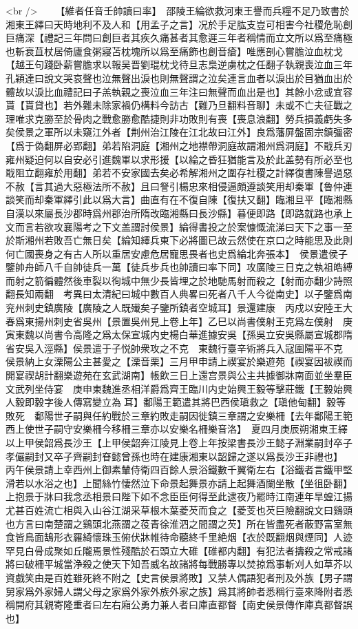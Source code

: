 <br />
　　【維者任音壬帥讀曰率】　邵陵王綸欲救河東王譽而兵糧不足乃致書於湘東王繹曰天時地利不及人和【用孟子之言】况於手足肱支豈可相害今社稷危恥創巨痛深【禮記三年問曰創巨者其疾久痛甚者其愈遲三年者稱情而立文所以爲至痛極也斬衰苴杖居倚廬食粥寢苫枕塊所以爲至痛飾也創音瘡】唯應剖心嘗膽泣血枕戈【越王句踐卧薪嘗膽求以報吴晋劉琨枕戈待旦志梟逆虜枕之任翻子執親喪泣血三年孔穎達曰說文哭哀聲也泣無聲出淚也則無聲謂之泣矣連言血者以淚出於目猶血出於體故以淚比血禮記曰子羔執親之喪泣血三年注曰無聲而血出是也】其餘小忿或宜容貰【貰貸也】若外難未除家禍仍構料今訪古【難乃旦翻料音聊】未或不亡夫征戰之理唯求克勝至於骨肉之戰愈勝愈酷捷則非功敗則有喪【喪息浪翻】勞兵損義虧失多矣侯景之軍所以未窺江外者【荆州治江陵在江北故曰江外】良爲藩屏盤固宗鎮彊密【爲于偽翻屏必郢翻】弟若陷洞庭【湘州之地襟帶洞庭故謂湘州爲洞庭】不戢兵刃雍州疑迫何以自安必引進魏軍以求形援【以綸之昏狂猶能言及於此盖勢有所必至也戢阻立翻雍於用翻】弟若不安家國去矣必希解湘州之圍存社稷之計繹復書陳譽過惡不赦【言其過大惡極法所不赦】且曰詧引楊忠來相侵逼頗遵談笑用却秦軍【魯仲連談笑而却秦軍繹引此以爲大言】曲直有在不復自陳【復扶又翻】臨湘旦平【臨湘縣自漢以來屬長沙郡時爲州郡治所隋改臨湘縣曰長沙縣】暮便即路【即路就路也承上文而言若欲攻襄陽考之下文盖謂討侯景】綸得書投之於案慷慨流涕曰天下之事一至於斯湘州若敗吾亡無日矣【綸知繹兵東下必將圖已故云然使在京口之時能思及此則何亡國喪身之有古人所以重居安慮危居寵思畏者也史爲綸北奔張本】　侯景遣侯子鑒帥舟師八千自帥徒兵一萬【徒兵步兵也帥讀曰率下同】攻廣陵三日克之執祖皓縛而射之箭徧體然後車裂以徇城中無少長皆埋之於地馳馬射而殺之【射而亦翻少詩照翻長知兩翻　考異曰太清紀曰城中數百人典畧曰死者八千人今從南史】以子鑒爲南兖州刺史鎮廣陵【廣陵之人既殱矣子鑒所鎮者空城耳】景還建康　丙戍以安陸王大春爲東揚州刺史省吳州【景置吳州見上卷上年】乙巳以尚書僕射王克爲左僕射　庚寅東魏以尚書令高隆之爲太保宣城内史楊白華進據安吳【孫吳立安吳縣屬宣城郡隋省安吳入涇縣】侯景遣于子悦帥衆攻之不克　東魏行臺辛術將兵入寇圍陽平不克　侯景納上女溧陽公主甚愛之【溧音栗】三月甲申請上禊宴於樂遊苑【禊宴因袚禊而開宴禊胡計翻樂遊苑在玄武湖南】帳飲三日上還宫景與公主共據御牀南面並坐羣臣文武列坐侍宴　庚申東魏進丞相洋爵爲齊王臨川内史始興王毅等擊莊鐵【王毅始興人毅即毅字後人傳寫變立為耳】鄱陽王範遣其將巴西侯瑱救之【瑱他甸翻】毅等敗死　鄱陽世子嗣與任約戰於三章約敗走嗣因徙鎮三章謂之安樂柵【去年鄱陽王範西上使世子嗣守安樂柵今移柵三章亦以安樂名柵樂音洛】　夏四月庚辰朔湘東王繹以上甲侯韶爲長沙王【上甲侯韶奔江陵見上卷上年按梁書長沙王懿子淵業嗣封卒子孝儼嗣封又卒子齊嗣封眘懿曾孫也時在建康湘東以韶歸之遂以爲長沙王非禮也】　丙午侯景請上幸西州上御素輦侍衛四百餘人景浴鐵數千翼衛左右【浴鐵者言鐵甲堅滑若以水浴之也】上聞絲竹悽然泣下命景起舞景亦請上起舞酒闌坐散【坐徂卧翻】上抱景于牀曰我念丞相景曰陛下如不念臣臣何得至此逮夜乃罷時江南連年旱蝗江揚尤甚百姓流亡相與入山谷江湖采草根木葉菱芡而食之【菱芰也芡巨險翻說文曰鷄頭也方言曰南楚謂之鷄頭北燕謂之䓈青徐淮泗之間謂之芡】所在皆盡死者蔽野富室無食皆鳥面鵠形衣羅綺懷珠玉俯伏牀帷待命聽終千里絶烟【衣於既翻烟與煙同】人迹罕見白骨成聚如丘隴焉景性殘酷於石頭立大碓【碓都内翻】有犯法者擣殺之常戒諸將曰破柵平城當浄殺之使天下知吾威名故諸將每戰勝專以焚掠爲事斬刈人如草芥以資戲笑由是百姓雖死終不附之【史言侯景將敗】又禁人偶語犯者刑及外族【男子謂舅家爲外家婦人謂父母之家爲外家外族外家之族】爲其將帥者悉稱行臺來降附者悉稱開府其親寄隆重者曰左右廂公勇力兼人者曰庫直都督【南史侯景傳作庫真都督誤也】